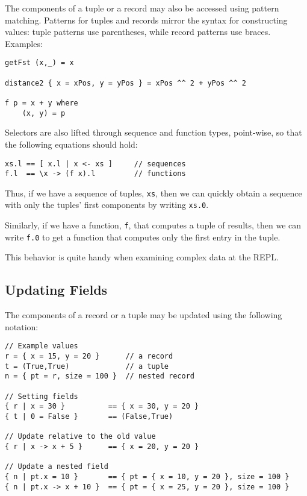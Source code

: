 The components of a tuple or a record may also be accessed using pattern
matching. Patterns for tuples and records mirror the syntax for
constructing values: tuple patterns use parentheses, while record
patterns use braces. Examples:

\begin{verbatim}
getFst (x,_) = x

distance2 { x = xPos, y = yPos } = xPos ^^ 2 + yPos ^^ 2

f p = x + y where
    (x, y) = p
\end{verbatim}

Selectors are also lifted through sequence and function types,
point-wise, so that the following equations should hold:

\begin{verbatim}
xs.l == [ x.l | x <- xs ]     // sequences
f.l  == \x -> (f x).l         // functions
\end{verbatim}

Thus, if we have a sequence of tuples, \texttt{xs}, then we can quickly
obtain a sequence with only the tuples' first components by writing
\texttt{xs.0}.

Similarly, if we have a function, \texttt{f}, that computes a tuple of
results, then we can write \texttt{f.0} to get a function that computes
only the first entry in the tuple.

This behavior is quite handy when examining complex data at the REPL.

\hypertarget{updating-fields}{%
\subsection{Updating Fields}\label{updating-fields}}

The components of a record or a tuple may be updated using the following
notation:

\begin{verbatim}
// Example values
r = { x = 15, y = 20 }      // a record
t = (True,True)             // a tuple
n = { pt = r, size = 100 }  // nested record

// Setting fields
{ r | x = 30 }          == { x = 30, y = 20 }
{ t | 0 = False }       == (False,True)

// Update relative to the old value
{ r | x -> x + 5 }      == { x = 20, y = 20 }

// Update a nested field
{ n | pt.x = 10 }       == { pt = { x = 10, y = 20 }, size = 100 }
{ n | pt.x -> x + 10 }  == { pt = { x = 25, y = 20 }, size = 100 }
\end{verbatim}

